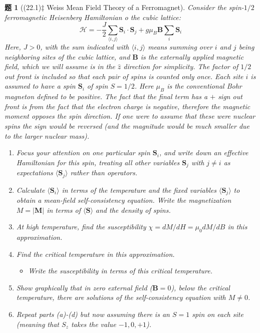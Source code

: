 \documentclass[UTF8,10pt,a4paper]{article}
\theoremstyle{Problem}
\newtheorem{prob}{题}
\theoremstyle{Solution}
\providecommand{\abs}[1]{\left\lvert#1\right\rvert}
\begin{document}
\begin{prob}[(22.1)$\ddagger$ Weiss Mean Field Theory of a Ferromagnet]
    Consider the spin-$1/2$ ferromagnetic Heisenberg Hamiltonian o the cubic lattice:
    \[
        \mathcal{H}=-\frac{J}{2}\sum_{\langle i,j\rangle}\bm{S}_i\cdot\bm{S}_j+g\mu_B\bm{B}\sum_i\bm{S}_i\tag{22.7}
    \]
    Here, $J>0$, with the sum indicated with $\langle i,j\rangle$ means summing over $i$ and $j$ being neighboring sites of the cubic lattice, and $\bm{B}$ is the externally applied magnetic field, which we will assume is in the $\hat{z}$ direction for simplicity. The factor of $1/2$ out front is included so that each pair of spins is counted only once. Each site $i$ is assumed to have a spin $\bm{S}_i$ of spin $S=1/2$. Here $\mu_B$ is the conventional Bohr magneton defined to be positive. The fact that the final term has a $+$ sign out front is from the fact that the electron charge is negative, therefore the magnetic moment opposes the spin direction. If one were to assume that these were nuclear spins the sign would be reversed (and the magnitude would be much smaller due to the larger nuclear mass).
    \begin{enumerate}
        \item[(a)] Focus your attention on one particular spin $\bm{S}_i$, and write down an effective Hamiltonian for this spin, treating all other variables $\bm{S}_j$ with $j\neq i$ as expectations $\langle\bm{S}_j\rangle$ rather than operators.
        \item[(b)] Calculate $\langle\bm{S}_i\rangle$ in terms of the temperature and the fixed variables $\langle\bm{S}_j\rangle$ to obtain a mean-field self-consistency equation. Write the magnetization $M=\abs{\bm{M}}$ in terms of $\langle\bm{S}\rangle$ and the density of spins.
        \item[(c)] At high temperature, find the susceptibility $\chi=dM/dH=\mu_0dM/dB$ in this approximation.
        \item[(d)] Find the critical temperature in this approximation.
        \begin{itemize}
            \item[$\triangleright$] Write the susceptibility in terms of this critical temperature.
        \end{itemize}
        \item[(e)] Show graphically that in zero external field ($\bm{B}=0$), below the critical temperature, there are solutions of the self-consistency equation with $M\neq 0$.
        \item[(f)] Repeat parts (a)-(d) but now assuming there is an $S=1$ spin on each site (meaning that $S_z$ takes the value $-1,0,+1$).
    \end{enumerate}
\end{prob}
\end{document}
